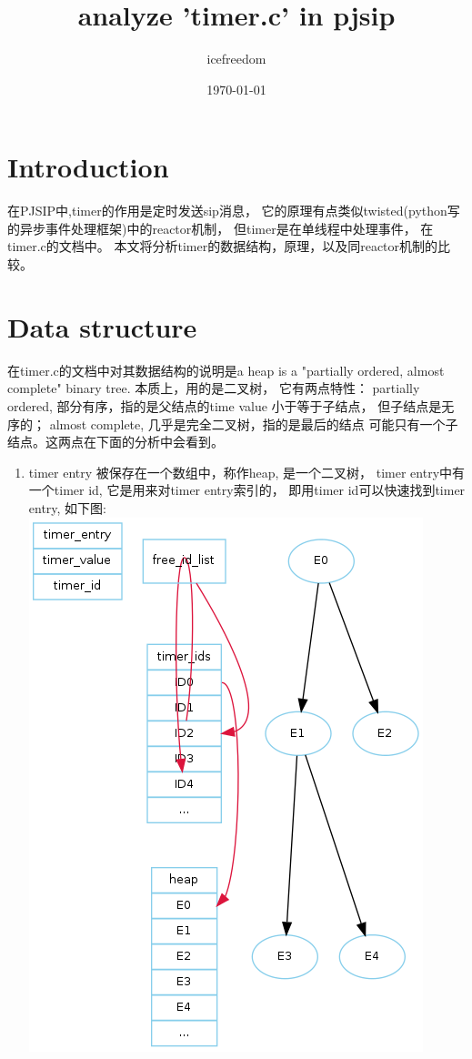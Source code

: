 \documentclass[a4paper, 12pt]{article}
\title{analyze 'timer.c' in pjsip}
\author{icefreedom}
\date{\today}
\begin{document}
\maketitle

\begin{CJK}{UTF8}{gkai}

\section{Introduction}
在PJSIP中,timer的作用是定时发送sip消息， 它的原理有点类似twisted(python写的异步事件处理框架)中的reactor机制， 但timer是在单线程中处理事件， 在timer.c的文档中。
本文将分析timer的数据结构，原理，以及同reactor机制的比较。

\section{Data structure}
在timer.c的文档中对其数据结构的说明是a heap is a "partially ordered, almost complete" binary tree. 本质上，用的是二叉树， 它有两点特性： 
partially ordered, 部分有序，指的是父结点的time value 小于等于子结点， 但子结点是无序的； almost complete, 几乎是完全二叉树，指的是最后的结点
可能只有一个子结点。这两点在下面的分析中会看到。

\begin{enumerate}
\item
timer entry 被保存在一个数组中，称作heap, 是一个二叉树， timer entry中有一个timer id,
它是用来对timer entry索引的， 即用timer id可以快速找到timer entry,  如下图: \\
\includegraphics{timerdatastructure.png}


\end{enumerate}
\end{CJK}
\end{document}
